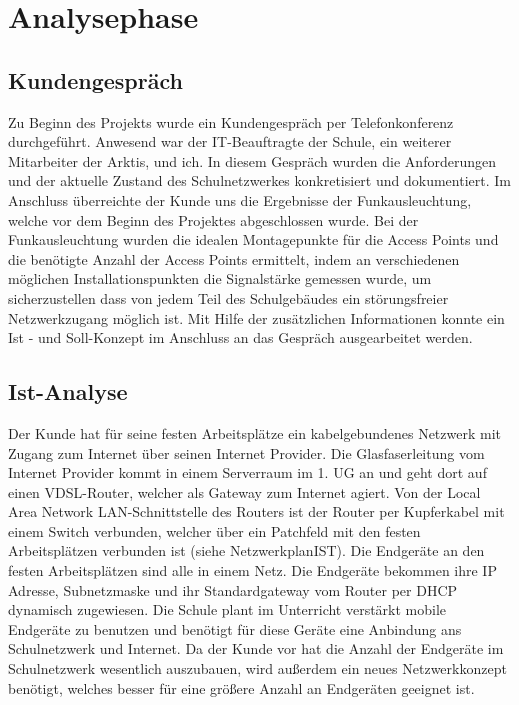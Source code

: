\section{Analysephase} 
\label{sec:Analysephase}

\subsection{Kundengespräch}
\label{sec:Kundengespräch}
Zu Beginn des Projekts wurde ein Kundengespräch per Telefonkonferenz durchgeführt. Anwesend war der IT-Beauftragte der Schule, ein weiterer Mitarbeiter der Arktis, und ich. In diesem Gespräch wurden die Anforderungen und der aktuelle Zustand des Schulnetzwerkes konkretisiert und dokumentiert. Im Anschluss überreichte der Kunde uns die Ergebnisse der Funkausleuchtung, welche vor dem Beginn des Projektes abgeschlossen wurde. Bei der Funkausleuchtung wurden die idealen Montagepunkte für die Access Points  und die benötigte Anzahl der Access Points ermittelt, indem an verschiedenen möglichen Installationspunkten die Signalstärke gemessen wurde, um sicherzustellen dass von jedem Teil des Schulgebäudes ein störungsfreier Netzwerkzugang möglich ist. Mit Hilfe der zusätzlichen Informationen konnte ein Ist - und Soll-Konzept im Anschluss an das Gespräch ausgearbeitet werden. 

\subsection{Ist-Analyse} 
\label{sec:IstAnalyse}
Der Kunde hat für seine festen Arbeitsplätze ein kabelgebundenes Netzwerk mit Zugang zum Internet über seinen Internet Provider. 
Die Glasfaserleitung vom Internet Provider kommt in einem Serverraum im 1. \ac{UG} an und geht dort auf einen \acs{VDSL}-Router, welcher als Gateway zum Internet agiert. Von der Local Area Network \acs{LAN}-Schnittstelle des Routers ist der Router per Kupferkabel mit einem Switch verbunden, welcher über ein Patchfeld mit den festen Arbeitsplätzen verbunden ist (siehe NetzwerkplanIST). Die Endgeräte an den festen Arbeitsplätzen sind alle in einem Netz. Die Endgeräte bekommen ihre IP Adresse, Subnetzmaske und ihr Standardgateway vom Router per \acs{DHCP} dynamisch zugewiesen. Die Schule plant im Unterricht verstärkt mobile Endgeräte zu benutzen und benötigt für diese Geräte eine Anbindung ans Schulnetzwerk und Internet. Da der Kunde vor hat die Anzahl der Endgeräte im Schulnetzwerk wesentlich auszubauen, wird außerdem ein neues Netzwerkkonzept benötigt, welches besser für eine größere Anzahl an Endgeräten geeignet ist. 

